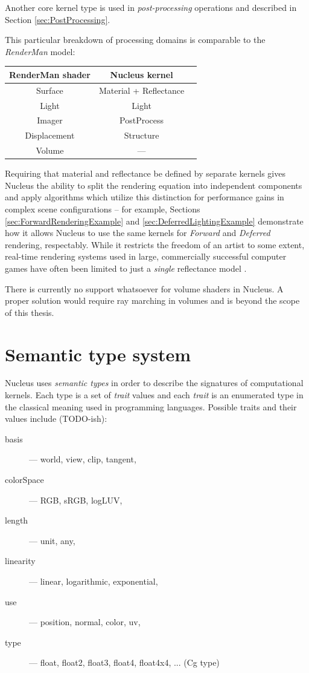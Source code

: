 Another core kernel type is used in \emph{post-processing} operations and described in Section \ref{sec:PostProcessing}.

This particular breakdown of processing domains is comparable to the \emph{RenderMan} model:

\begin{center}
\begin{tabular}{ | c | c | c | }
\hline
RenderMan shader & Nucleus kernel \\
\hline
Surface & Material + Reflectance \\
Light & Light \\
Imager & PostProcess \\
Displacement & Structure \\
Volume & --- \\
\hline
\end{tabular}
\end{center}

Requiring that material and reflectance be defined by separate kernels gives Nucleus the ability to split the rendering equation into independent components and apply algorithms which utilize this distinction for performance gains in complex scene configurations -- for example, Sections \ref{sec:ForwardRenderingExample} and \ref{sec:DeferredLightingExample} demonstrate how it allows Nucleus to use the same kernels for \emph{Forward} and \emph{Deferred} rendering, respectably. While it restricts the freedom of an artist to some extent, real-time rendering systems used in large, commercially successful computer games have often been limited to just a \emph{single} reflectance model \cite{CryEngine3Deferred, Killzone2Deferred}.

There is currently no support whatsoever for volume shaders in Nucleus. A proper solution would require ray marching in volumes and is beyond the scope of this thesis.

\section{Semantic type system}

Nucleus uses \emph{semantic types} in order to describe the signatures of computational kernels. Each type is a set of \emph{trait} values and each \emph{trait} is an enumerated type in the classical meaning used in programming languages. Possible traits and their values include (TODO-ish):
\begin{description}
\item[basis] --- world, view, clip, tangent,
\item[colorSpace] --- RGB, sRGB, logLUV,
\item[length] --- unit, any,
\item[linearity] --- linear, logarithmic, exponential,
\item[use] --- position, normal, color, uv,
\item[type] --- float, float2, float3, float4, float4x4, ... (Cg type)
\end{description}


